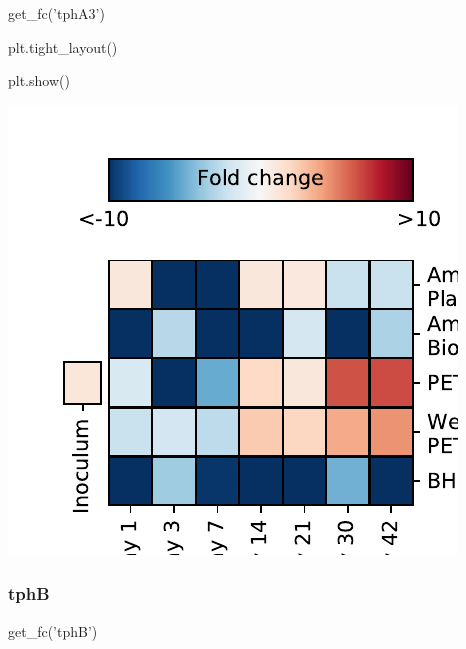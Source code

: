 \documentclass[
]{article}
\newenvironment{Shaded}{\begin{snugshade}}{\end{snugshade}}
\newcommand{\NormalTok}[1]{#1}
\newcommand{\StringTok}[1]{\textcolor[rgb]{0.31,0.60,0.02}{#1}}
\begin{document}
\begin{Shaded}
\begin{Highlighting}[]
\NormalTok{get_fc(}\StringTok{'tphA3'}\NormalTok{)}
\end{Highlighting}
\end{Shaded}

\begin{Shaded}
\begin{Highlighting}[]
\NormalTok{plt.tight_layout()}
\end{Highlighting}
\end{Shaded}

\begin{Shaded}
\begin{Highlighting}[]
\NormalTok{plt.show()}
\end{Highlighting}
\end{Shaded}

\includegraphics{20-6-15-PET-plastisphere-PICRUSt2_files/figure-latex/plot_fc_tphA3-1.pdf}

\hypertarget{tphb-1}{%
\subsubsection{tphB}\label{tphb-1}}

\begin{Shaded}
\begin{Highlighting}[]
\NormalTok{get_fc(}\StringTok{'tphB'}\NormalTok{)}
\end{Highlighting}
\end{Shaded}
\end{document}

